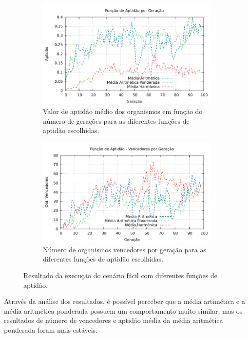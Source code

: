 \begin{figure}[H]
\centering
	\begin{subfigure}[b]{0.45\textwidth}
        \includegraphics[width=\textwidth]{fig/fitness-value-comparison.pdf}
		\caption{Valor de aptidão médio dos organismos em função do número de
		gerações para as diferentes funções de aptidão escolhidas.}
	\end{subfigure}
	\begin{subfigure}[b]{0.45\textwidth}
        \includegraphics[width=\textwidth]{fig/fitness-winners-comparison.pdf}
        \caption{Número de organismos vencedores por geração para as diferentes
        funções de aptidão escolhidas.}
		\label{fig:fitness-experiment-winners}
	\end{subfigure}

    \caption{Resultado da execução do cenário fácil com diferentes funções de
    aptidão.}
	\label{fig:fitness-experiment}
\end{figure}

Através da análise dos resultados, é possível perceber que a média
artimética e a média aritmética ponderada possuem um comportamento muito
similar, mas os resultados de número de vencedores e aptidão média da média
aritmética ponderada foram mais estáveis.

